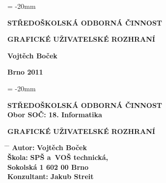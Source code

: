 \documentclass[12pt, a4paper, oneside]{article}
\newcommand{\B}{\textbf} %
\begin{document}

\pagestyle{empty} %
 
\voffset = -20mm %
\enlargethispage{60mm} %

\begin{center}
 
\Large \B{STŘEDOŠKOLSKÁ ODBORNÁ ČINNOST}

\vspace{60mm}

\huge %
\B{GRAFICKÉ UŽIVATELSKÉ ROZHRANÍ} 

\Large

\vspace{90mm}


\B{Vojtěch Boček} \\

\vspace{40mm}

\B{Brno 2011}


\end{center}

\newpage %

\voffset = -20mm %
\enlargethispage{60mm} %

\begin{center}

\Large \B{STŘEDOŠKOLSKÁ ODBORNÁ ČINNOST}  \\
\vspace{10mm}
 \normalsize 
\B{Obor SOČ: 18. Informatika}%

\vspace{45mm}

\LARGE %
\B{GRAFICKÉ UŽIVATELSKÉ ROZHRANÍ} 
\end{center}  
\large

\vspace{50mm}


\begin{tabbing}
\hspace{10mm} \= \hspace{30mm}  \=   \kill %
  \> \B{Autor:}  \> \B{Vojtěch Boček}        \\[8mm] 
  \> \B{Škola:}   \> \B{SPŠ a~VOŠ technická, }     \\
  \>              \> \B{Sokolská 1 602 00 Brno}    \\[8mm]

  \> \B{Konzultant:} \> \B {Jakub Streit} 
\end{tabbing}
\end{document}

